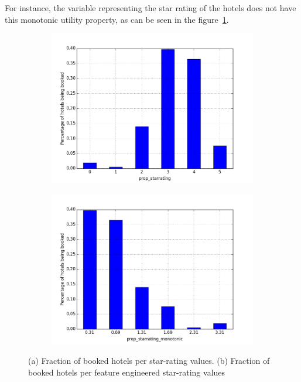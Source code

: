 \documentclass{llncs}
\begin{document}
For instance, the variable representing the star rating of the hotels does not have this monotonic utility property, as can be seen in the figure~\ref{subfig:normal_starrate}.
\begin{figure}
    \centering
    \begin{subfigure}{.5\textwidth}
        \includegraphics[width=1.0\linewidth]{figure_normal_starrate.png}
        \subcaption{}
        \label{subfig:normal_starrate}
    \end{subfigure}%
    \begin{subfigure}{.5\textwidth}
        \includegraphics[width=1.0\linewidth]{figure_monotonic_starrate.png}
        \subcaption{}
        \label{subfig:monotonic_starrate}
    \end{subfigure}
    \vspace*{0.1in}
    \caption{(a) Fraction of booked hotels per star-rating values. (b) Fraction of booked hotels per feature engineered star-rating values}
        \label{fig:normal_vs_monotonic}
\end{figure}
\end{document}
